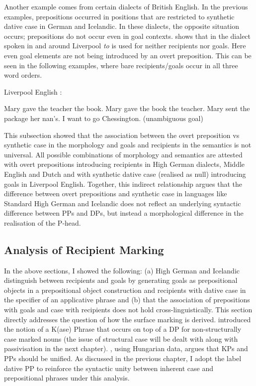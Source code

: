 	Another example comes from certain dialects of British English. In the previous examples, prepositions occurred in positions that are restricted to synthetic dative case in German and Icelandic. In these dialects, the opposite situation occurs; prepositions do not occur even in goal contexts. \cite{Biggs.2015} shows that in the dialect spoken in and around Liverpool \textit{to} is used for neither recipients nor goals. Here even goal elements are not being introduced by an overt preposition. This can be seen in the following examples, where bare recipients/goals occur in all three word orders.
	\begin{exe}
		\ex Liverpool English \citep{Biggs.2015}:\label{ex:liverpool}
		\begin{xlist}
			\ex Mary gave the teacher the book.
			\ex Mary gave the book the teacher.
			\ex Mary sent the package her nan's.
			\ex I want to go Chessington. (unambiguous goal)
		\end{xlist}
	\end{exe}
	This subsection showed that the association between the overt preposition vs synthetic case in the morphology and goals and recipients in the semantics is not universal. All possible combinations of morphology and semantics are attested with overt prepositions introducing recipients in High German dialects, Middle English and Dutch and with synthetic dative case (realised as null) introducing goals in Liverpool English. Together, this indirect relationship argues that the difference between overt prepositions and synthetic case in languages like Standard High German and Icelandic does not reflect an underlying syntactic difference between PPs and DPs, but instead a morphological difference in the realisation of the P-head.
	\subsection{Analysis of Recipient Marking}
	In the above sections, I showed the following: (a) High German and Icelandic distinguish between recipients and goals by generating goals as prepositional objects in a prepositional object construction and recipients with dative case in the specifier of an applicative phrase and (b) that the association of prepositions with goals and case with recipients does not hold cross-linguistically. This section directly addresses the question of how the surface marking is derived. \cite{Bayer.2001} introduced the notion of a K(ase) Phrase that occurs on top of a DP for non-structurally case marked nouns (the issue of structural case will be dealt with along with passivisation in the next chapter). \cite{Asbury.2005}, using Hungarian data, argues that KPs and PPs should be unified. As discussed in the previous chapter, I adopt the label dative PP to reinforce the syntactic unity between inherent case and prepositional phrases under this analysis.

